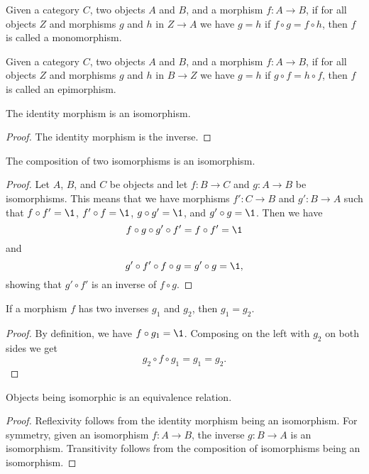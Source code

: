 \documentclass[../math.tex]{subfiles}
\begin{document}
\begin{definition}
    Given a category $C$, two objects $A$ and $B$, and a morphism $f : A \to B$,
    if for all objects $Z$ and morphisms $g$ and $h$ in $Z \to A$ we have $g =
    h$ if $f \circ g = f \circ h$, then $f$ is called a monomorphism.
\end{definition}

\begin{definition}
    Given a category $C$, two objects $A$ and $B$, and a morphism $f : A \to B$,
    if for all objects $Z$ and morphisms $g$ and $h$ in $B \to Z$ we have $g =
    h$ if $g \circ f = h \circ f$, then $f$ is called an epimorphism.
\end{definition}

\begin{theorem}
    The identity morphism is an isomorphism.
\end{theorem}
\begin{proof}
    The identity morphism is the inverse.
\end{proof}

\begin{theorem}
    The composition of two isomorphisms is an isomorphism.
\end{theorem}
\begin{proof}
    Let $A$, $B$, and $C$ be objects and let $f : B \to C$ and $g : A \to B$ be
    isomorphisms.  This means that we have morphisms $f' : C \to B$ and $g' : B
    \to A$ such that $f \circ f' = \1$, $f' \circ f = \1$, $g \circ g' = \1$,
    and $g' \circ g = \1$.  Then we have
    \[
        f \circ g \circ g' \circ f' = f \circ f' = \1
    \]
    and
    \[
        g' \circ f' \circ f \circ g = g' \circ g = \1,
    \]
    showing that $g' \circ f'$ is an inverse of $f \circ g$.
\end{proof}

\begin{theorem}
    If a morphism $f$ has two inverses $g_1$ and $g_2$, then $g_1 = g_2$.
\end{theorem}
\begin{proof}
    By definition, we have $f \circ g_1 = \1$.  Composing on the left with $g_2$
    on both sides we get
    \[
        g_2 \circ f \circ g_1 = g_1 = g_2.
    \]
\end{proof}

\begin{theorem}
    Objects being isomorphic is an equivalence relation.
\end{theorem}
\begin{proof}
    Reflexivity follows from the identity morphism being an isomorphism.  For
    symmetry, given an isomorphism $f : A \to B$, the inverse $g : B \to A$ is
    an isomorphism.  Transitivity follows from the composition of isomorphisms
    being an isomorphism.
\end{proof}
\end{document}
